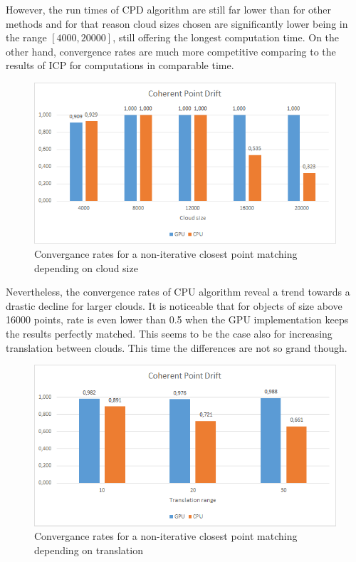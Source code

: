 \documentclass[titlepage]{article}
\begin{document}
However, the run times of CPD algorithm are still far lower than for other methods and for that reason cloud sizes chosen are significantly lower being in the range $[4000, 20000]$, still offering the longest computation time. On the other hand, convergence rates are much more competitive comparing to the results of ICP for computations in comparable time.
\begin{figure}[H]
\includegraphics[width=\textwidth]{ss-cpd-1.png}
\caption{Convergance rates for a non-iterative closest point matching depending on cloud size}
\end{figure}
Nevertheless, the convergence rates of CPU algorithm reveal a trend towards a drastic decline for larger clouds. It is noticeable that for objects of size above 16000 points, rate is even lower than 0.5 when the GPU implementation keeps the results perfectly matched.
This seems to be the case also for increasing translation between clouds. This time the differences are not so grand though.
\begin{figure}[H]
\includegraphics[width=\textwidth]{ss-cpd-2.png}
\caption{Convergance rates for a non-iterative closest point matching depending on translation}
\end{figure}
\end{document}
